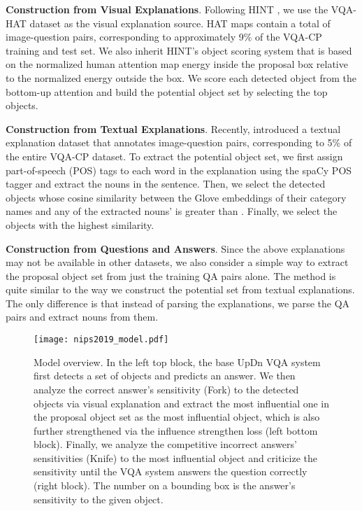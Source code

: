 \documentclass{article}
\begin{document}
\noindent\textbf{Construction from Visual Explanations}. Following HINT \cite{selvaraju2019taking}, we use the VQA-HAT dataset \cite{das2017human} as the visual explanation source. HAT maps contain a total of  image-question pairs, corresponding to approximately 9\% of the VQA-CP training and test set. We also inherit HINT's object scoring system that is based on the normalized human attention map energy inside the proposal box relative to the normalized energy outside the box. We score each detected object from the bottom-up attention and build the potential object set by selecting the top  objects.

\noindent\textbf{Construction from Textual Explanations}. Recently,  \cite{park2018multimodal} introduced a textual explanation dataset that annotates  image-question pairs, corresponding to 5\% of the entire VQA-CP dataset. To extract the potential object set, we first assign part-of-speech (POS) tags to each word in the explanation using the spaCy POS tagger \cite{spacy2} and extract the nouns in the sentence. Then, we select the detected objects whose cosine similarity between the Glove embeddings \cite{pennington2014glove} of their category names and any of the extracted nouns' is greater than . Finally, we select the  objects with the highest similarity.

\noindent\textbf{Construction from Questions and Answers}. Since the above explanations may not be available in other datasets, we also consider a simple way to extract the proposal object set from just the training QA pairs alone. The method is quite similar to the way we construct the potential set from textual explanations. The only difference is that instead of parsing the explanations, we parse the QA pairs and extract nouns from them.



\begin{figure}[!t]
    \centering
    \texttt{[image: nips2019\_model.pdf]}
    \caption{Model overview. In the left top block, the base UpDn VQA system first detects a set of objects and predicts an answer. We then analyze the correct answer's sensitivity (Fork) to the detected objects via visual explanation and extract the most influential one in the proposal object set as the most influential object, which is also further strengthened via the influence strengthen loss (left bottom block). Finally, we analyze the competitive incorrect answers' sensitivities (Knife) to the most influential object and criticize the sensitivity until the VQA system answers the question correctly (right block). The number on a bounding box is the answer's sensitivity to the given object.}
    \label{fig:model_overview}
\end{figure}
\end{document}
